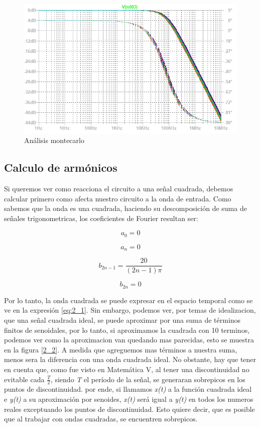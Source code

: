 \begin{figure}[H]
\begin{centering}
\includegraphics[scale=0.6]{../Ex2/resources2/montecarlo} 
\par\end{centering}
\caption{Análisis montecarlo}
\label{2_5} 
\end{figure}

\subsection{Calculo de armónicos}

Si queremos ver como reacciona el circuito a una señal cuadrada, debemos
calcular primero como afecta nuestro circuito a la onda de entrada.
Como sabemos que la onda es una cuadrada, haciendo su descomposición
de suma de señales trigonometricas, los coeficientes de Fourier resultan
ser:

\[
a_{0}=0
\]

\[
a_{n}=0
\]

\[
b_{2n-1}=\frac{20}{(2n-1)\pi}
\]

\[
b_{2n}=0
\]

Por lo tanto, la onda cuadrada se puede expresar en el espacio temporal
como se ve en la expresión \ref{eq:2_1}. Sin embargo, podemos ver,
por temas de idealizacion, que una señal cuadrada ideal, se puede
aproximar por una suma de términos finitos de senoidales, por lo tanto,
si aproximamos la cuadrada con 10 terminos, podemos ver como la aproximacion
van quedando mas parecidas, esto se muestra en la figura \ref{2_2}.
A medida que agreguemos mas términos a nuestra suma, menos sera la
diferencia con una onda cuadrada ideal. No obstante, hay que tener
en cuenta que, como fue visto en Matemática V, al tener una discontinuidad
no evitable cada $\frac{T}{2}$, siendo \emph{T} el perí­odo de la
señal, se generaran sobrepicos en los puntos de discontinuidad. por
ende, si llamamos \emph{x(t)} a la función cuadrada ideal e \emph{y(t)}
a su aproximación por senoides, \emph{x(t)} será igual a \emph{y(t)
}en todos los numeros reales exceptuando los puntos de discontinuidad.
Esto quiere decir, que es posible que al trabajar con ondas cuadradas,
se encuentren sobrepicos.

